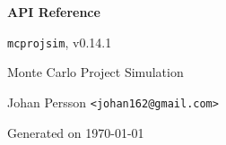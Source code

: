 \documentclass[11pt,b5paper,twoside,openright]{report}
\begin{document}
\begin{titlepage}
  \centering
  \vspace*{2.0cm}
  {\Huge\bfseries\color{lightorange}API Reference\par}
  \vspace{1.2cm}
  {\Large \texttt{mcprojsim}, v0.14.1\par}
  \vspace{1.2cm}
  {\Large Monte Carlo Project Simulation\par}
  \vfill
  {\large Johan Persson \texttt{<johan162@gmail.com>}\par}
  {\large Generated on \today\par}
\end{titlepage}

\tableofcontents
\clearpage

\end{document}
